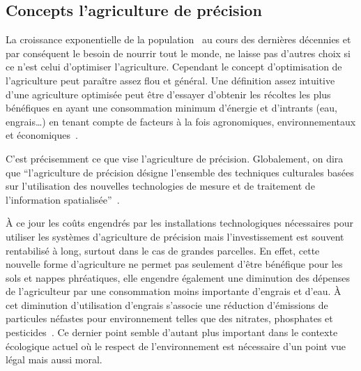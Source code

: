 \subsection{Concepts l'agriculture de précision}
La croissance exponentielle de la population~\cite{wiki:popu_mondiale}
au cours des dernières décennies et par conséquent le besoin de nourrir
tout le monde, ne laisse pas d'autres choix
si ce n'est celui d'optimiser l'agriculture.
Cependant le concept d'optimisation de l'agriculture peut 
paraître assez flou et général.
Une définition assez intuitive d'une agriculture optimisée
peut être d'essayer d'obtenir
les récoltes les plus bénéfiques en ayant une consommation minimum d'énergie
et d'intrants (eau, engrais\dots) en tenant compte de facteurs à la fois
agronomiques, environnementaux et économiques~\cite{wiki:agri_prec}.

C'est précisemment ce que vise l'agriculture de précision.
Globalement, on dira que \enquote{l'agriculture de précision désigne
l'ensemble des techniques culturales basées sur l'utilisation
des nouvelles technologies de mesure et de traitement de l'information
spatialisée}~\cite{jullien2005agriculture}.

À ce jour les coûts engendrés par les installations technologiques
nécessaires pour utiliser les systèmes d'agriculture de précision
mais l'investissement est souvent rentabilisé à long, surtout 
dans le cas de grandes parcelles.
En effet, cette nouvelle forme d'agriculture ne permet pas seulement
d'être bénéfique pour les sols et nappes phréatiques,
elle engendre également une diminution des dépenses de l'agriculteur
par une consommation moins importante d'engrais et d'eau.
À cet diminution d'utilisation d'engrais s'associe une réduction
d'émissions de particules néfastes pour
environnement telles que des nitrates, phosphates
et pesticides~\cite{emission_agri_particules}.
Ce dernier point semble d'autant plus important dans le contexte
écologique actuel où le respect de l'environnement est nécessaire
d'un point vue légal mais aussi moral.

